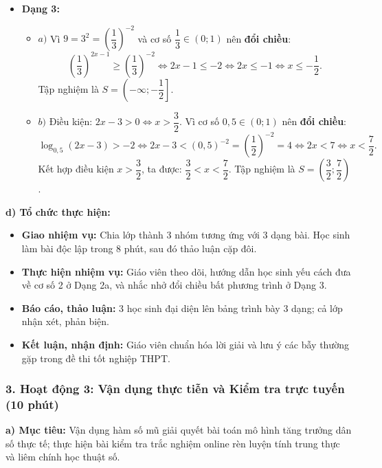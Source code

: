 \documentclass[12pt, a4paper]{article}
\begin{document}
\begin{itemize}[leftmargin=0.6cm]
    \item \textbf{Dạng 3:}
    \begin{itemize}
        \item $a)$ Vì $9 = 3^2 = \left(\dfrac{1}{3}\right)^{-2}$ và cơ số $\dfrac{1}{3} \in (0; 1)$ nên \textbf{đổi chiều}:
        $$\left(\dfrac{1}{3}\right)^{2x - 1} \ge \left(\dfrac{1}{3}\right)^{-2} \iff 2x - 1 \le -2 \iff 2x \le -1 \iff x \le -\dfrac{1}{2}.$$
        Tập nghiệm là $S = \left(-\infty; -\dfrac{1}{2}\right]$.
        \item $b)$ Điều kiện: $2x - 3 > 0 \iff x > \dfrac{3}{2}$.
        Vì cơ số $0{,}5 \in (0; 1)$ nên \textbf{đổi chiều}:
        $$\log_{0{,}5} (2x - 3) > -2 \iff 2x - 3 < (0{,}5)^{-2} = \left(\dfrac{1}{2}\right)^{-2} = 4 \iff 2x < 7 \iff x < \dfrac{7}{2}.$$
        Kết hợp điều kiện $x > \dfrac{3}{2}$, ta được: $\dfrac{3}{2} < x < \dfrac{7}{2}$.
        Tập nghiệm là $S = \left(\dfrac{3}{2}; \dfrac{7}{2}\right)$.
    \end{itemize}
\end{itemize}

\noindent \textbf{d) Tổ chức thực hiện:}
\begin{itemize}[leftmargin=0.6cm]
    \item \textbf{Giao nhiệm vụ:} Chia lớp thành 3 nhóm tương ứng với 3 dạng bài. Học sinh làm bài độc lập trong 8 phút, sau đó thảo luận cặp đôi.
    \item \textbf{Thực hiện nhiệm vụ:} Giáo viên theo dõi, hướng dẫn học sinh yếu cách đưa về cơ số 2 ở Dạng 2a, và nhắc nhở đổi chiều bất phương trình ở Dạng 3.
    \item \textbf{Báo cáo, thảo luận:} 3 học sinh đại diện lên bảng trình bày 3 dạng; cả lớp nhận xét, phản biện.
    \item \textbf{Kết luận, nhận định:} Giáo viên chuẩn hóa lời giải và lưu ý các bẫy thường gặp trong đề thi tốt nghiệp THPT.
\end{itemize}

\subsubsection*{3. Hoạt động 3: Vận dụng thực tiễn và Kiểm tra trực tuyến (10 phút)}

\noindent \textbf{a) Mục tiêu:}
Vận dụng hàm số mũ giải quyết bài toán mô hình tăng trưởng dân số thực tế; thực hiện bài kiểm tra trắc nghiệm online rèn luyện tính trung thực và liêm chính học thuật số.
\end{document}
